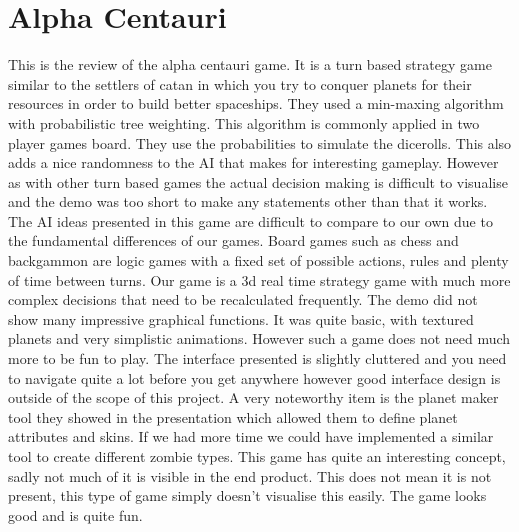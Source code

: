 \section{Alpha Centauri}
This is the review of the alpha centauri game. It is a turn based strategy game similar to the settlers of catan in which you try to conquer planets for their resources in order to build better spaceships.
They used a min-maxing algorithm with probabilistic tree weighting. This algorithm is commonly applied in two player games board. They use the probabilities to simulate the dicerolls. This also adds a nice randomness to the AI that makes for interesting gameplay. However as with other turn based games the actual decision making is difficult to visualise and the demo was too short to make any statements other than that it works. The AI ideas presented in this game are difficult to compare to our own due to the fundamental differences of our games. Board games such as chess and backgammon are logic games with a fixed set of possible actions, rules and plenty of time between turns. Our game is a 3d real time strategy game with much more complex decisions that need to be recalculated frequently.
The demo did not show many impressive graphical functions. It was quite basic, with textured planets and very simplistic animations. However such a game does not need much more to be fun to play. The interface presented is slightly cluttered and you need to navigate quite a lot before you get anywhere however good interface design is outside of the scope of this project. A very noteworthy item is the planet maker tool they showed in the presentation which allowed them to define planet attributes and skins. If we had more time we could have implemented a similar tool to create different zombie types.
This game has quite an interesting concept, sadly not much of it is visible in the end product. This does not mean it is not present, this type of game simply doesn't visualise this easily. The game looks good and is quite fun.